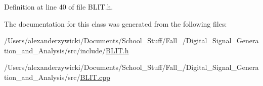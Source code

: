 Definition at line 40 of file B\+L\+I\+T.\+h.



The documentation for this class was generated from the following files\+:\begin{DoxyCompactItemize}
\item 
/\+Users/alexanderzywicki/\+Documents/\+School\+\_\+\+Stuff/\+Fall\+\_/\+Digital\+\_\+\+Signal\+\_\+\+Generation\+\_\+and\+\_\+\+Analysis/src/include/\hyperlink{BLIT_8h}{B\+L\+I\+T.\+h}\item 
/\+Users/alexanderzywicki/\+Documents/\+School\+\_\+\+Stuff/\+Fall\+\_/\+Digital\+\_\+\+Signal\+\_\+\+Generation\+\_\+and\+\_\+\+Analysis/src/\hyperlink{BLIT_8cpp}{B\+L\+I\+T.\+cpp}\end{DoxyCompactItemize}
